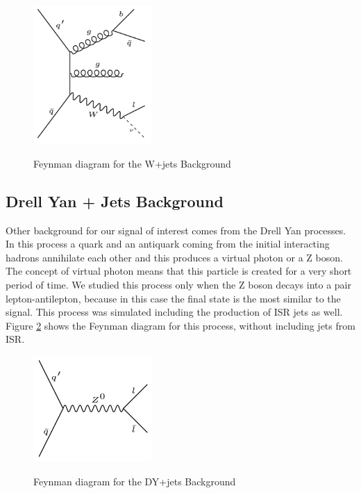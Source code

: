   
 \begin{figure}[h] 
 \centering
 \caption{Feynman diagram for the W+jets Background}
 \includegraphics[width=0.4\textwidth]{./Capitulos/Model/w+jets}  
 \label{w_jets_feynman}
 \end{figure}  

 \subsection{Drell Yan + Jets Background}
 
 Other background for our signal of interest comes from the Drell Yan processes. In this process a quark and an antiquark coming from the initial interacting hadrons annihilate each other and this
 produces a virtual photon or a Z boson. The concept of virtual photon means that this particle is created for a very short period of time. We studied this process only when the Z boson decays into a pair lepton-antilepton, because in this case the final state is the most similar to the signal. This process was simulated including the production of ISR jets as well. Figure \ref{dy_jets_feynman} shows the Feynman diagram for this process, without including jets from ISR.
 
  \begin{figure}[h] 
 \centering
 \caption{Feynman diagram for the DY+jets Background}
 \includegraphics[width=0.4\textwidth]{./Capitulos/Model/DY+jets} 
 \label{dy_jets_feynman}
 \end{figure} 
 
